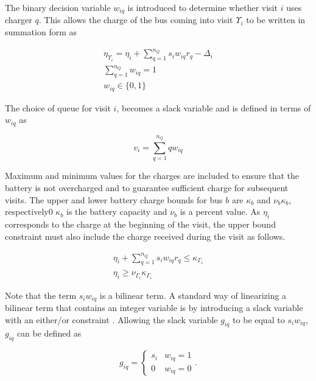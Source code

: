 \documentclass[ee,msthesis]{usuthesis}
\begin{document}
The binary decision variable \(w_{iq}\) is introduced to determine whether visit \(i\) uses charger \(q\). This allows the
charge of the bus coming into visit \(\Upsilon_i\) to be written in summation form as

\begin{subequations}
    \label{subeq:pre_next_charge}
\begin{align}
    \eta_{\Upsilon_i} = \eta_i + \sum_{q=1}^{n_Q} s_i w_{iq} r_q - \Delta_i  \\
    \sum_{q=1}^{n_Q} w_{iq} = 1 \\
    w_{iq} \in \{0,1\}
\end{align}
\end{subequations}

The choice of queue for visit \(i\), becomes a slack variable and is defined in terms of \(w_{iq}\) as

\begin{equation}
    v_i = \sum_{q=1}^{n_Q} qw_{iq}
\end{equation}

Maximum and minimum values for the charges are included to ensure that the battery is not overcharged and to guarantee
sufficient charge for subsequent visits. The upper and lower battery charge bounds for bus \(b\) are \(\kappa_b\) and \(\nu_b \kappa_b\),
respectively0 \(\kappa_b\) is the battery capacity and \(\nu_b\) is a percent value. As \(\eta_i\) corresponds to the charge at the
beginning of the visit, the upper bound constraint must also include the charge received during the visit as follows.

\begin{subequations}
    \label{subeq:pre_min_max}
\begin{align}
    \eta_i + \sum_{q=1}^{n_Q} s_i w_{iq} r_q \leq \kappa_{\Gamma_i}                 \\
    \eta_i \geq \nu_{\Gamma_i} \kappa_{\Gamma_i}
\end{align}
\end{subequations}

Note that the term \(s_i w_{iq}\) is a bilinear term. A standard way of linearizing a bilinear term that contains an
integer variable is by introducing a slack variable with an either/or constraint
\cite{chen-2010-applied,rodriguez-2013-compar-asses}. Allowing the slack variable \(g_{iq}\) to be equal to \(s_i w_{iq}\),
\(g_{iq}\) can be defined as

\begin{equation}
    \label{eq:giq_cases}
    g_{iq} =
    \begin{cases}
        s_i & w_{iq} = 1 \\
        0 & w_{iq} = 0
    \end{cases}.
\end{equation}
\end{document}
